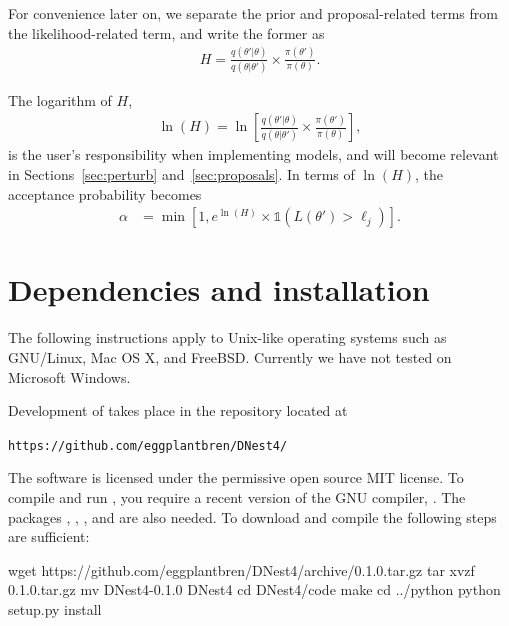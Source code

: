 \documentclass[article, nojss]{jss}
\newcommand{\params}{\theta}
\begin{document}
For convenience later on, we 
separate the prior and proposal-related terms from
the likelihood-related term, and write the former as
\begin{align}
H = \frac{q(\params'|\params)}{q(\params | \params')}
\times \frac{\pi(\params')}{\pi(\params)}.
\end{align}

The logarithm of $H$,
\begin{align}
\ln(H) = \ln\left[\frac{q(\params'|\params)}{q(\params | \params')}
\times \frac{\pi(\params')}{\pi(\params)}\right],
\end{align}
is the user's responsibility when implementing models,
and will become relevant in Sections~\ref{sec:perturb}
and~\ref{sec:proposals}.
In terms of $\ln(H)$, the
acceptance probability becomes
\begin{align}
\alpha &= \min\left[1,
e^{\ln(H)}\times
\mathds{1}\left(L(\params') > \ell_j\right)
\right].\label{eqn:logH}
\end{align}








\section{Dependencies and installation}\label{sec:installation}
The following instructions apply to Unix-like operating systems such as
GNU/Linux, Mac OS X, and FreeBSD. Currently we have not tested
 on Microsoft Windows.

Development of  takes place in the  repository located at
\begin{center}
{\tt https://github.com/eggplantbren/DNest4/}\\
\end{center}
The software
is licensed under the permissive open source
MIT license. To compile and run ,
you require a recent version of the GNU
 compiler, . The 
packages  \citep{numpy},  \citep{matplotlib},
 \citep{pandas}, and  \citep{cython} are also needed.
To download and compile 
the following steps are sufficient:
\begin{CodeChunk}
\begin{CodeInput}
wget https://github.com/eggplantbren/DNest4/archive/0.1.0.tar.gz
tar xvzf 0.1.0.tar.gz
mv DNest4-0.1.0 DNest4
cd DNest4/code
make
cd ../python
python setup.py install
\end{CodeInput}
\end{CodeChunk}
\end{document}

